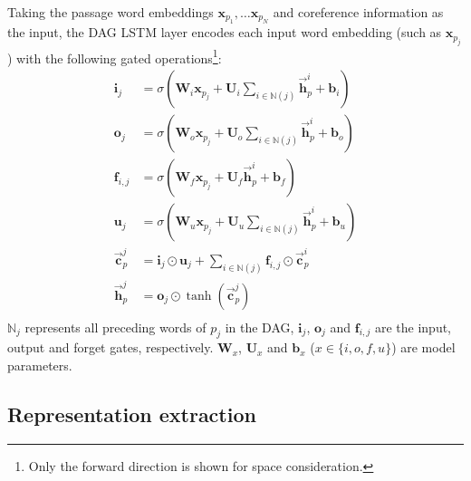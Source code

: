 \documentclass[letterpaper]{article}
\begin{document}
Taking the passage word embeddings $\boldsymbol{x}_{p_1}, \dots \boldsymbol{x}_{p_N}$ and coreference information as the input, 
the DAG LSTM layer encodes each input word embedding (such as $\boldsymbol{x}_{p_j}$) with the following gated operations\footnote{Only the forward direction is shown for space consideration.}:
\begin{equation*}
\begin{split}
\boldsymbol{i}_j &= \sigma(\boldsymbol{W}_i \boldsymbol{x}_{p_j} + \boldsymbol{U}_i \sum_{i\in \mathbb{N}(j)}\overrightarrow{\boldsymbol{h}}_p^i + \boldsymbol{b}_i) \\
\boldsymbol{o}_j &= \sigma(\boldsymbol{W}_o \boldsymbol{x}_{p_j} + \boldsymbol{U}_o \sum_{i\in \mathbb{N}(j)}\overrightarrow{\boldsymbol{h}}_p^i + \boldsymbol{b}_o) \\
\boldsymbol{f}_{i,j} &= \sigma(\boldsymbol{W}_f \boldsymbol{x}_{p_j} + \boldsymbol{U}_f \overrightarrow{\boldsymbol{h}}_p^i + \boldsymbol{b}_f) \\
\boldsymbol{u}_j &= \sigma(\boldsymbol{W}_u \boldsymbol{x}_{p_j} + \boldsymbol{U}_u \sum_{i\in \mathbb{N}(j)}\overrightarrow{\boldsymbol{h}}_p^i + \boldsymbol{b}_u) \\
\overrightarrow{\boldsymbol{c}}_p^j &= \boldsymbol{i}_j \odot \boldsymbol{u}_j + \sum_{i\in \mathbb{N}(j)} \boldsymbol{f}_{i,j} \odot \overrightarrow{\boldsymbol{c}}_p^i \\
\overrightarrow{\boldsymbol{h}}_p^j &= \boldsymbol{o}_j \odot \tanh (\overrightarrow{\boldsymbol{c}}_p^j) \\
\end{split}
\end{equation*}
$\mathbb{N}_j$ represents all preceding words of $p_j$ in the DAG, $\boldsymbol{i}_j$, $\boldsymbol{o}_j$ and $\boldsymbol{f}_{i,j}$ are the input, output and forget gates, respectively. $\boldsymbol{W}_x$, $\boldsymbol{U}_x$ and $\boldsymbol{b}_x$ ($x \in \{i,o,f,u\}$) are model parameters.

\subsection{Representation extraction}
\end{document}
